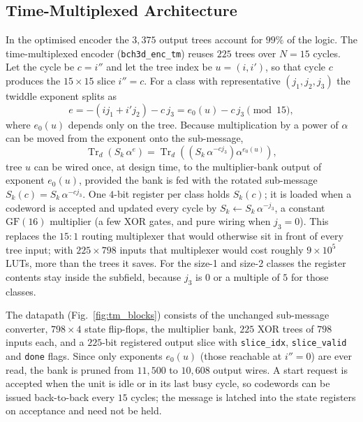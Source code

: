\documentclass[11pt,a4paper]{article}
\begin{document}
\subsection{Time-Multiplexed Architecture}
\label{sec:tm}
In the optimised encoder the $3,375$ output trees account for $99\%$ of the logic. The time-multiplexed encoder (\texttt{bch3d\_enc\_tm}) reuses $225$ trees over $N=15$ cycles. Let the cycle be $c=i''$ and let the tree index be $u=(i,i')$, so that cycle $c$ produces the $15\times15$ slice $i''=c$. For a class with representative $(j_1,j_2,j_3)$ the twiddle exponent splits as
\begin{equation}
e = -(i j_1 + i' j_2) - c\, j_3 = e_0(u) - c\, j_3 \pmod{15},
\end{equation}
where $e_0(u)$ depends only on the tree. Because multiplication by a power of $\alpha$ can be moved from the exponent onto the sub-message,
\begin{equation}
\operatorname{Tr}_d\!\left(S_k\,\alpha^{e}\right) = \operatorname{Tr}_d\!\left(\left(S_k\,\alpha^{-c j_3}\right)\alpha^{e_0(u)}\right),
\end{equation}
tree $u$ can be wired once, at design time, to the multiplier-bank output of exponent $e_0(u)$, provided the bank is fed with the rotated sub-message $S_k(c)=S_k\,\alpha^{-c j_3}$. One $4$-bit register per class holds $S_k(c)$; it is loaded when a codeword is accepted and updated every cycle by $S_k \leftarrow S_k\,\alpha^{-j_3}$, a constant $\text{GF}(16)$ multiplier (a few XOR gates, and pure wiring when $j_3=0$). This replaces the $15{:}1$ routing multiplexer that would otherwise sit in front of every tree input; with $225\times798$ inputs that multiplexer would cost roughly $9\times10^5$ LUTs, more than the trees it saves. For the size-1 and size-2 classes the register contents stay inside the subfield, because $j_3$ is $0$ or a multiple of $5$ for those classes.

The datapath (Fig.~\ref{fig:tm_blocks}) consists of the unchanged sub-message converter, $798\times4$ state flip-flops, the multiplier bank, $225$ XOR trees of $798$ inputs each, and a $225$-bit registered output slice with \texttt{slice\_idx}, \texttt{slice\_valid} and \texttt{done} flags. Since only exponents $e_0(u)$ (those reachable at $i''=0$) are ever read, the bank is pruned from $11,500$ to $10,608$ output wires. A start request is accepted when the unit is idle or in its last busy cycle, so codewords can be issued back-to-back every $15$ cycles; the message is latched into the state registers on acceptance and need not be held.
\end{document}

